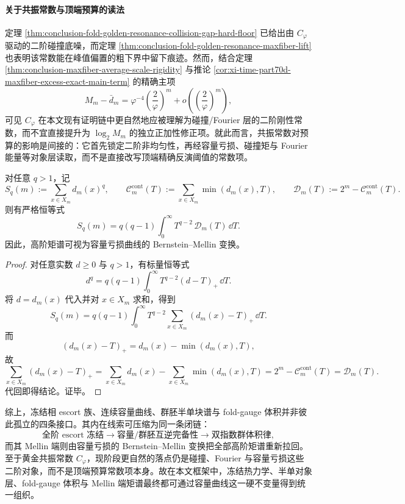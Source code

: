 \paragraph{关于共振常数与顶端预算的读法}
定理 \ref{thm:conclusion-fold-golden-resonance-collision-gap-hard-floor} 已给出由 \(C_\varphi\) 驱动的二阶碰撞底噪，而定理 \ref{thm:conclusion-fold-golden-resonance-maxfiber-lift} 也表明该常数能在峰值偏置的粗下界中留下痕迹。然而，结合定理 \ref{thm:conclusion-maxfiber-average-scale-rigidity} 与推论 \ref{cor:xi-time-part70d-maxfiber-excess-exact-main-term} 的精确主项
\[
M_m-\bar d_m
=
\varphi^{-4}\left(\frac{2}{\varphi}\right)^m
+o\!\left(\left(\frac{2}{\varphi}\right)^m\right),
\]
可见 \(C_\varphi\) 在本文现有证明链中更自然地应被理解为碰撞/Fourier 层的二阶刚性常数，而不宜直接提升为 \(\log_2 M_m\) 的独立正加性修正项。就此而言，共振常数对预算的影响是间接的：它首先锁定二阶非均匀性，再经容量亏损、碰撞矩与 Fourier 能量等对象层读取，而不是直接改写顶端精确反演阈值的常数项。

\begin{proposition}\label{prop:conclusion-capacity-defect-bernstein-mellin}
对任意 \(q>1\)，记
\[
S_q(m):=\sum_{x\in X_m}d_m(x)^q,
\qquad
\mathcal C_m^{\mathrm{cont}}(T):=\sum_{x\in X_m}\min(d_m(x),T),
\qquad
\mathcal D_m(T):=2^m-\mathcal C_m^{\mathrm{cont}}(T).
\]
则有严格恒等式
\[
S_q(m)
=
q(q-1)\int_0^\infty T^{q-2}\,\mathcal D_m(T)\,\dd T.
\]
因此，高阶矩谱可视为容量亏损曲线的 Bernstein--Mellin 变换。
\end{proposition}
\begin{proof}
对任意实数 \(d\ge 0\) 与 \(q>1\)，有标量恒等式
\[
d^q
=
q(q-1)\int_0^\infty T^{q-2}(d-T)_+\,\dd T.
\]
将 \(d=d_m(x)\) 代入并对 \(x\in X_m\) 求和，得到
\[
S_q(m)
=
q(q-1)\int_0^\infty T^{q-2}
\sum_{x\in X_m}(d_m(x)-T)_+\,\dd T.
\]
而
\[
(d_m(x)-T)_+=d_m(x)-\min(d_m(x),T),
\]
故
\[
\sum_{x\in X_m}(d_m(x)-T)_+
=
\sum_{x\in X_m}d_m(x)-\sum_{x\in X_m}\min(d_m(x),T)
=
2^m-\mathcal C_m^{\mathrm{cont}}(T)
=
\mathcal D_m(T).
\]
代回即得结论。证毕。
\end{proof}

\noindent
综上，冻结相 escort 族、连续容量曲线、群胚半单块谱与 fold-gauge 体积并非彼此孤立的四条接口。其内在线索可压缩为同一条闭链：
\[
\text{全阶 escort 冻结}
\longrightarrow
\text{容量/群胚互逆完备性}
\longrightarrow
\text{双指数群体积律},
\]
而其 Mellin 端则由容量亏损的 Bernstein--Mellin 变换把全部高阶矩谱重新拉回。至于黄金共振常数 \(C_\varphi\)，现阶段更自然的落点仍是碰撞、Fourier 与容量亏损这些二阶对象，而不是顶端预算常数项本身。故在本文框架中，冻结热力学、半单对象层、fold-gauge 体积与 Mellin 端矩谱最终都可通过容量曲线这一硬不变量得到统一组织。

\endinput
